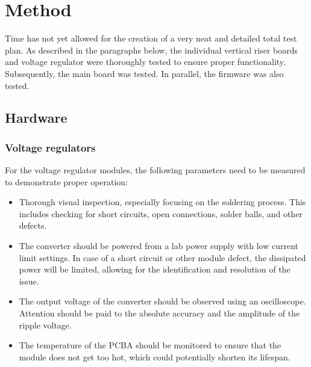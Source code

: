 \section{Method}
Time has not yet allowed for the creation of a very neat and detailed total test plan. As described in the paragraphs below, the individual vertical riser boards and voltage regulator were thoroughly tested to ensure proper functionality. Subsequently, the main board was tested. In parallel, the firmware was also tested.

\subsection{Hardware}
\subsubsection{Voltage regulators}
For the voltage regulator modules, the following parameters need to be measured to demonstrate proper operation:
\begin{itemize}
\item Thorough visual inspection, especially focusing on the soldering process. This includes checking for short circuits, open connections, solder balls, and other defects.
\item The converter should be powered from a lab power supply with low current limit settings. In case of a short circuit or other module defect, the dissipated power will be limited, allowing for the identification and resolution of the issue.
\item The output voltage of the converter should be observed using an oscilloscope. Attention should be paid to the absolute accuracy and the amplitude of the ripple voltage.
\item The temperature of the PCBA should be monitored to ensure that the module does not get too hot, which could potentially shorten its lifespan.
\end{itemize}  

